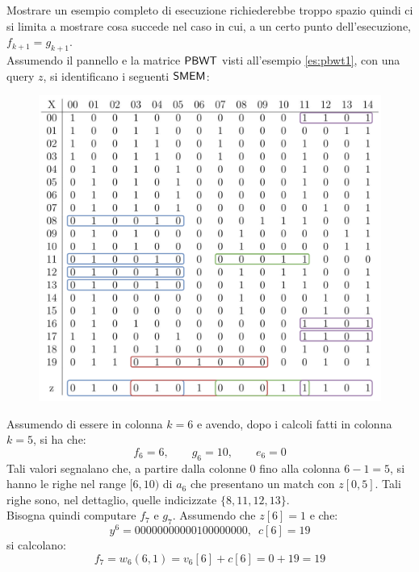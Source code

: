 \begin{esempio}
  \label{es:algo5}
  Mostrare un esempio completo di esecuzione richiederebbe troppo spazio quindi
  ci si limita a mostrare cosa succede nel caso in cui, a un certo punto
  dell'esecuzione, $f_{k+1}=g_{k+1}$.\\
  Assumendo il pannello e la matrice $\mbox{\rm {\sf PBWT}}$ visti all'esempio
  \ref{es:pbwt1}, con una query $z$, si identificano i
  seguenti $\mbox{\rm {\sf SMEM}}$:
  \begin{figure}[H]
    \centering
    \includegraphics[scale = 0.365]{img/pbwtmatch.pdf}
  \end{figure}
  Assumendo di essere in colonna $k=6$ e avendo, dopo i calcoli fatti in colonna
  $k=5$, si ha che:
  \[f_6=6,\quad\quad g_6=10,\quad\quad e_6=0\]
  Tali valori segnalano che, a partire dalla colonne $0$ fino alla colonna
  $6-1=5$, si 
  hanno le righe nel range $[6,10)$ di $a_{6}$ che presentano un match con
  $z[0,5]$. Tali 
  righe sono, nel dettaglio, quelle indicizzate $\{8, 11, 12, 13\}$.\\
  Bisogna quindi computare $f_7$ e $g_7$. Assumendo che $z[6]=1$ e che:
  \[y^6=00000000000100000000,\,\,\,c[6]=19\]
  si calcolano:
  \[f_7=w_6(6,1)=v_6[6]+c[6]=0+19=19\]

\end{esempio}
